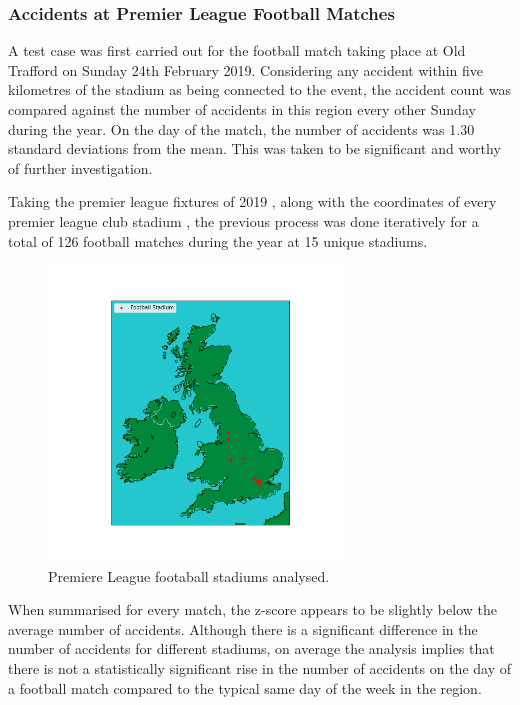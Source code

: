 \documentclass[12pt]{article}
\begin{document}
\subsubsection{Accidents at Premier League Football Matches}

A test case was first carried out for the football match taking place at Old Trafford on Sunday 24th February 2019. Considering any accident within five kilometres of the stadium as being connected to the event, the accident count was compared against the number of accidents in this region every other Sunday during the year. On the day of the match, the number of accidents was 1.30 standard deviations from the mean. This was taken to be significant and worthy of further investigation.

Taking the premier league fixtures of 2019 \parencite{fixtures}, along with the coordinates of every premier league club stadium \parencite{stadiums}, the previous process was done iteratively for a total of 126 football matches during the year at 15 unique stadiums.

\begin{figure}[h]
\centering     %
\includegraphics[width=0.70\textwidth]{stadiums}
\caption{Premiere League footaball stadiums analysed.}
\end{figure}

When summarised for every match, the z-score appears to be slightly below the average number of accidents. Although there is a significant difference in the number of accidents for different stadiums, on average the analysis implies that there is not a statistically significant rise in the number of accidents on the day of a football match compared to the typical same day of the week in the region.
\end{document}
